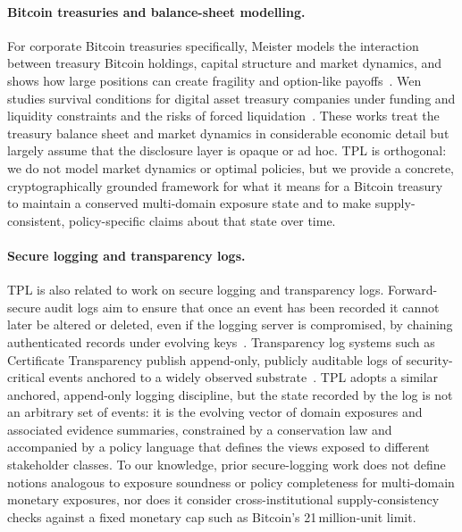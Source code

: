 \documentclass[11pt]{article}
\begin{document}
\paragraph{Bitcoin treasuries and balance-sheet modelling.}
For corporate Bitcoin treasuries specifically, Meister models the interaction between treasury Bitcoin holdings, capital structure and market dynamics, and shows how large positions can create fragility and option-like payoffs~\cite{Meister2025}.
Wen studies survival conditions for digital asset treasury companies under funding and liquidity constraints and the risks of forced liquidation~\cite{Wen2025}.
These works treat the treasury balance sheet and market dynamics in considerable economic detail but largely assume that the disclosure layer is opaque or ad hoc.
TPL is orthogonal: we do not model market dynamics or optimal policies, but we provide a concrete, cryptographically grounded framework for what it means for a Bitcoin treasury to maintain a conserved multi-domain exposure state and to make supply-consistent, policy-specific claims about that state over time.

\paragraph{Secure logging and transparency logs.}
TPL is also related to work on secure logging and transparency logs.
Forward-secure audit logs aim to ensure that once an event has been recorded it cannot later be altered or deleted, even if the logging server is compromised, by chaining authenticated records under evolving keys~\cite{SchneierKelsey1999}.
Transparency log systems such as Certificate Transparency publish append-only, publicly auditable logs of security-critical events anchored to a widely observed substrate~\cite{Laurie2014CT}.
TPL adopts a similar anchored, append-only logging discipline, but the state recorded by the log is not an arbitrary set of events: it is the evolving vector of domain exposures and associated evidence summaries, constrained by a conservation law and accompanied by a policy language that defines the views exposed to different stakeholder classes.
To our knowledge, prior secure-logging work does not define notions analogous to exposure soundness or policy completeness for multi-domain monetary exposures, nor does it consider cross-institutional supply-consistency checks against a fixed monetary cap such as Bitcoin's 21\,million-unit limit.
\end{document}
